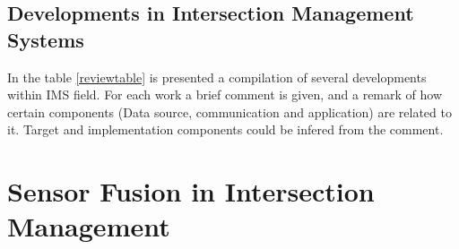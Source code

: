 

\subsection{Developments in Intersection Management Systems}

In the table \ref{reviewtable} is presented a compilation of several developments within IMS field. For each work a brief comment is given, and a remark of how certain components (Data source, communication and application) are related to it. Target and implementation components could be infered from the comment.



\section{Sensor Fusion in Intersection Management} \label{s23}

